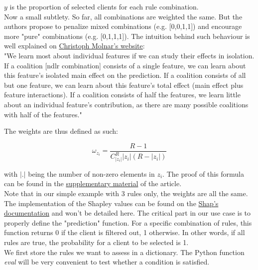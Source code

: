$y$ is the proportion of selected clients for each rule combination. \\

Now a small subtlety. So far, all combinations are weighted the same. But the authors propose to penalize mixed combinations (e.g. [0,0,1,1]) and encourage more "pure" combinations (e.g. [0,1,1,1]). The intuition behind such behaviour is well explained on \href{https://christophm.github.io/interpretable-ml-book/shapley.html}{Christoph Molnar’s website}: \\

"We learn most about individual features if we can study their effects in isolation. If a coalition [ndlr combination] consists of a single feature, we can learn about this feature’s isolated main effect on the prediction. If a coalition consists of all but one feature, we can learn about this feature’s total effect (main effect plus feature interactions). If a coalition consists of half the features, we learn little about an individual feature’s contribution, as there are many possible coalitions with half of the features."

The weights are thus defined as such:

$$\omega_{z_i} = \frac{R-1}{C_{|z_i|}^R |z_i|(R-|z_i|)}$$

with $|.|$ being the number of non-zero elements in $z_i$. The proof of this formula can be found in the \href{https://proceedings.neurips.cc/paper/2017/hash/8a20a8621978632d76c43dfd28b67767-Abstract.html}{supplementary material} of the article. \\

Note that in our simple example with 3 rules only, the weights are all the same. \\

The implementation of the Shapley values can be found on the \href{https://shap.readthedocs.io/en/latest/example_notebooks/tabular_examples/model_agnostic/Simple%20Kernel%20SHAP.html}{Shap's documentation} and won't be detailed here. The critical part in our use case is to properly define the "prediction" function. For a specific combination of rules, this function returns $0$ if the client is filtered out, 1 otherwise. In other words, if all rules are true, the probability for a client to be selected is 1. \\

We first store the rules we want to assess in a dictionary. The Python function \textit{eval} will be very convenient to test whether a condition is satisfied.

